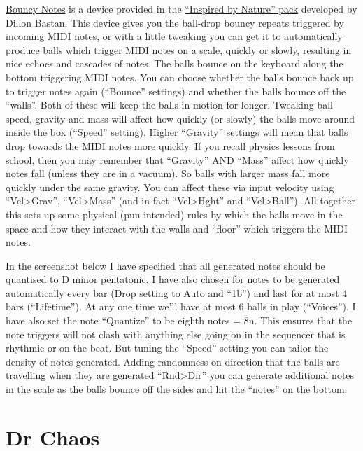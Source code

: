 \documentclass[
  12pt,
  letterpaper,
  oneside,
  open=any]{scrbook}
\makeatletter
\newcommand*\pandocbounded[1]{%
  \sbox\pandoc@box{#1}%
  \Gscale@div\@tempa{\textheight}{\dimexpr\ht\pandoc@box+\dp\pandoc@box\relax}%
  \Gscale@div\@tempb{\linewidth}{\wd\pandoc@box}%
  \ifdim\@tempb\p@<\@tempa\p@\let\@tempa\@tempb\fi%
  \ifdim\@tempa\p@<\p@\scalebox{\@tempa}{\usebox\pandoc@box}%
  \else\usebox{\pandoc@box}%
  \fi%
}
\makeatother
\begin{document}
\href{https://www.youtube.com/watch?v=C2hQ-WbKBhU}{Bouncy Notes} is a
device provided in the
\href{https://www.ableton.com/en/packs/inspired-nature/\#?item_type=max_for_live}{``Inspired
by Nature'' pack} developed by Dillon Bastan. This device gives you the
ball-drop bouncy repeats triggered by incoming MIDI notes, or with a
little tweaking you can get it to automatically produce balls which
trigger MIDI notes on a scale, quickly or slowly, resulting in nice
echoes and cascades of notes. The balls bounce on the keyboard along the
bottom triggering MIDI notes. You can choose whether the balls bounce
back up to trigger notes again (``Bounce'' settings) and whether the
balls bounce off the ``walls''. Both of these will keep the balls in
motion for longer. Tweaking ball speed, gravity and mass will affect how
quickly (or slowly) the balls move around inside the box (``Speed''
setting). Higher ``Gravity'' settings will mean that balls drop towards
the MIDI notes more quickly. If you recall physics lessons from school,
then you may remember that ``Gravity'' AND ``Mass'' affect how quickly
notes fall (unless they are in a vacuum). So balls with larger mass fall
more quickly under the same gravity. You can affect these via input
velocity using ``Vel\textgreater Grav'', ``Vel\textgreater Mass'' (and
in fact ``Vel\textgreater Hght'' and ``Vel\textgreater Ball''). All
together this sets up some physical (pun intended) rules by which the
balls move in the space and how they interact with the walls and
``floor'' which triggers the MIDI notes.

In the screenshot below I have specified that all generated notes should
be quantised to D minor pentatonic. I have also chosen for notes to be
generated automatically every bar (Drop setting to Auto and ``1b'') and
last for at most 4 bars (``Lifetime''). At any one time we'll have at
most 6 balls in play (``Voices''). I have also set the note ``Quantize''
to be eighth notes = 8n. This ensures that the note triggers will not
clash with anything else going on in the sequencer that is rhythmic or
on the beat. But tuning the ``Speed'' setting you can tailor the density
of notes generated. Adding randomness on direction that the balls are
travelling when they are generated ``Rnd\textgreater Dir'' you can
generate additional notes in the scale as the balls bounce off the sides
and hit the ``notes'' on the bottom.

\pandocbounded{\texttt{[image: images/Bouncy\_notes.png]}}

\section{Dr Chaos}\label{dr-chaos}
\end{document}
